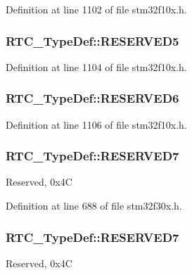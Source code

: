 Definition at line 1102 of file stm32f10x.\-h.

\hypertarget{struct_r_t_c___type_def_a052c02494c2dde3f74ff7d8987ee5230}{
\subsubsection[{R\-E\-S\-E\-R\-V\-E\-D5}]{ R\-T\-C\-\_\-\-Type\-Def\-::\-R\-E\-S\-E\-R\-V\-E\-D5}}\label{struct_r_t_c___type_def_a052c02494c2dde3f74ff7d8987ee5230}


Definition at line 1104 of file stm32f10x.\-h.

\hypertarget{struct_r_t_c___type_def_a74bdff4226786261b4c18b63dd21e3bd}{
\subsubsection[{R\-E\-S\-E\-R\-V\-E\-D6}]{ R\-T\-C\-\_\-\-Type\-Def\-::\-R\-E\-S\-E\-R\-V\-E\-D6}}\label{struct_r_t_c___type_def_a74bdff4226786261b4c18b63dd21e3bd}


Definition at line 1106 of file stm32f10x.\-h.

\hypertarget{struct_r_t_c___type_def_a09936292ef8d82974b55a03a1080534e}{
\subsubsection[{R\-E\-S\-E\-R\-V\-E\-D7}]{ R\-T\-C\-\_\-\-Type\-Def\-::\-R\-E\-S\-E\-R\-V\-E\-D7}}\label{struct_r_t_c___type_def_a09936292ef8d82974b55a03a1080534e}
Reserved, 0x4\-C 

Definition at line 688 of file stm32f30x.\-h.

\hypertarget{struct_r_t_c___type_def_a09936292ef8d82974b55a03a1080534e}{
\subsubsection[{R\-E\-S\-E\-R\-V\-E\-D7}]{ R\-T\-C\-\_\-\-Type\-Def\-::\-R\-E\-S\-E\-R\-V\-E\-D7}}\label{struct_r_t_c___type_def_a09936292ef8d82974b55a03a1080534e}
Reserved, 0x4\-C 

